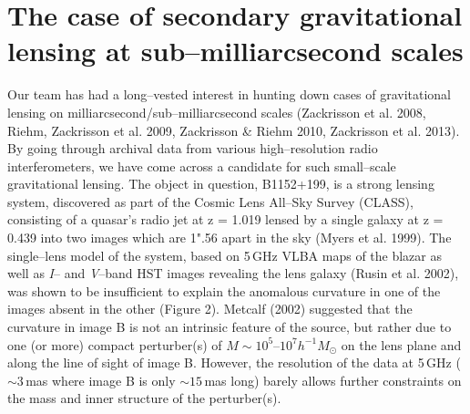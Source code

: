 \documentclass[a4paper, 11pt]{article}
\begin{document}
\section{The case of secondary gravitational lensing at sub--milliarcsecond scales}
Our team has had a long--vested interest in hunting down cases of gravitational lensing on milliarcsecond/sub--milliarcsecond scales (Zackrisson et al. 2008, Riehm, Zackrisson et al. 2009, Zackrisson \& Riehm 2010, Zackrisson et al. 2013). By going through archival data from various high--resolution radio interferometers, we have come across a candidate for such small--scale gravitational lensing. The object in question, B1152+199, is a strong lensing system, discovered as part of the Cosmic Lens All--Sky Survey (CLASS), consisting of a quasar's radio jet at z = 1.019 lensed by a single galaxy at z = 0.439 into two images which are 1".56 apart in the sky (Myers et al. 1999). The single--lens model of the system, based on 5\,GHz VLBA maps of the blazar as well as {\it I}-- and {\it V}--band HST images revealing the lens galaxy (Rusin et al. 2002), was shown to be insufficient to explain the anomalous curvature in one of the images absent in the other (Figure 2). Metcalf (2002) suggested that the curvature in image B is not an intrinsic feature of the source, but rather due to one (or more) compact perturber(s) of $M\sim10^5$--$10^7 h^{-1} M_\odot$ on the lens plane and along the line of sight of image B. However, the resolution of the data at 5\,GHz ($\sim3$\,mas where image B is only $\sim15$\,mas long) barely allows further constraints on the mass and inner structure of the perturber(s).
\end{document}
